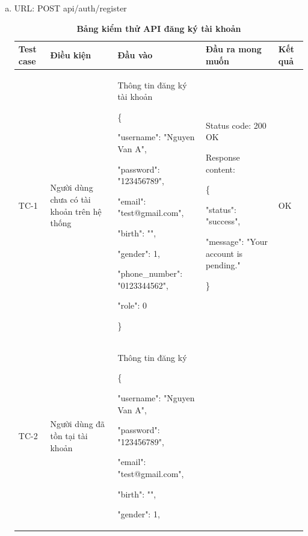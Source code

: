 \begin{enumerate}[a)]
  \item URL: POST api/auth/register
  
  \break
  \begin{xltabular}{\textwidth}{
    | >{\raggedright\arraybackslash}p{1cm}
    | >{\raggedright\arraybackslash}p{2.5cm}
    | >{\raggedright\arraybackslash}X
    | >{\raggedright\arraybackslash}X
    | >{\raggedright\arraybackslash}p{1cm}|
    }
    \caption{\bfseries \fontsize{12pt}{0pt}\selectfont Bảng kiểm thử API đăng ký tài khoản}
    \\
    \hline
    \bfseries Test case    &\bfseries Điều kiện   &\bfseries Đầu vào 
    &\bfseries Đầu ra mong muốn &\bfseries Kết quả\\ \hline
  
  
    TC-1
    & Người dùng chưa có tài khoản trên hệ thống
    & Thông tin đăng ký tài khoản

    \{

    "username": "Nguyen Van A",

    "password": "123456789",

    "email": "test@gmail.com",

    "birth": "",

    "gender": 1,

    "phone\_number": "0123344562",

    "role": 0

   \}
  
    & 
  
    Status code: 200 OK
  
      Response content:
  
      \{
  
    "status": "success",
  
    "message": "Your account is pending."
  
    \}
    
    & OK
  
    \\ \hline
  
    TC-2
    & Người dùng đã tồn tại tài khoản
    & Thông tin đăng ký 

    \{

    "username": "Nguyen Van A",

    "password": "123456789",

    "email": "test@gmail.com",

    "birth": "",

    "gender": 1,


\end{xltabular}
\end{enumerate}
